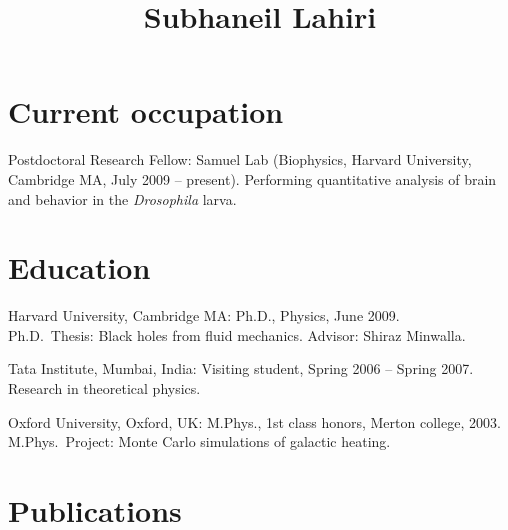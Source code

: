 \documentclass[letterpaper,10pt,notopicbreak,titleabove,plain]{simplecv}
\title{Subhaneil Lahiri}
\begin{document}
\pagestyle{empty}
\maketitle


\section{Current occupation}
\begin{topic}
\item[Postdoctoral Research Fellow:] Samuel Lab (Biophysics, Harvard University, Cambridge MA, July 2009 -- present). Performing quantitative analysis of brain and behavior in the \emph{Drosophila} larva.
\end{topic}

\section{Education}
\begin{topic}
  \item[Harvard University, Cambridge MA:] Ph.D., Physics, June 2009. \\
  Ph.D.\ Thesis: Black holes from fluid mechanics. Advisor: Shiraz Minwalla.%

  \item[Tata Institute, Mumbai, India:] Visiting student, Spring 2006 -- Spring 2007. Research in theoretical physics.

  \item[Oxford University, Oxford, UK:] M.Phys., 1st class honors, Merton college, 2003. \\
  M.Phys.\ Project: Monte Carlo simulations of galactic heating. %

\end{topic}

\section{Publications}
\nocite{Lahiri2011,Bhattacharya:2009gm,Bhattacharyya:2007vs,Lahiri:2007ae,Biswas:2006tj}


\end{document}

